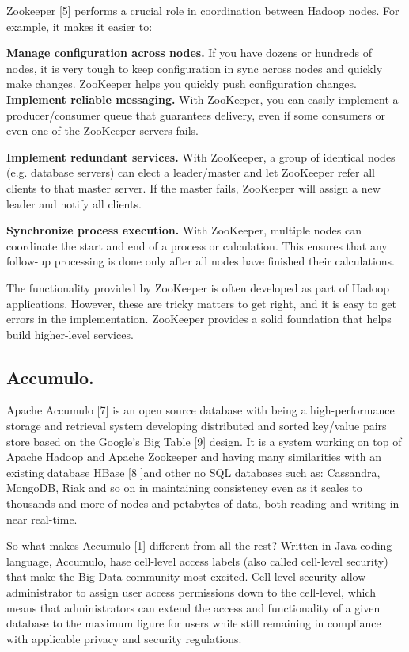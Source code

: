 \documentclass{acm_proc_article-sp}
\begin{document}
\setlength{\parindent}{1cm} Zookeeper [5] performs a crucial role in coordination between Hadoop nodes. For example, it makes it easier to:

\setlength{\parindent}{1cm} \textbf{Manage configuration across nodes.}  If you have dozens or hundreds of nodes, it is very tough to keep configuration in sync across nodes and quickly make changes. ZooKeeper helps you quickly push configuration changes.\\

\setlength{\parindent}{1cm} \textbf{Implement reliable messaging.} With ZooKeeper, you can easily implement a producer/consumer queue that guarantees delivery, even if some consumers or even one of the ZooKeeper servers fails.

\setlength{\parindent}{1cm} \textbf{Implement redundant services.} With ZooKeeper, a group of identical nodes (e.g. database servers) can elect a leader/master and let ZooKeeper refer all clients to that master server. If the master fails, ZooKeeper will assign a new leader and notify all clients.

\setlength{\parindent}{1cm} \textbf{Synchronize process execution.} With ZooKeeper, multiple nodes can coordinate the start and end of a process or calculation. This ensures that any follow-up processing is done only after all nodes have finished their calculations.

\setlength{\parindent}{1cm} The functionality provided by ZooKeeper is often developed as part of Hadoop applications. However, these are tricky matters to get right, and it is easy to get errors in the implementation. ZooKeeper provides a solid foundation that helps build higher-level services.

\subsection{Accumulo. } Apache Accumulo [7] is an open source database with being a high-performance storage and retrieval system developing distributed and sorted key/value pairs store based on the Google’s Big Table [9] design. It is a system working on top of Apache Hadoop and Apache Zookeeper and having many similarities with an existing database HBase [8 ]and other no SQL databases such as: Cassandra, MongoDB, Riak and so on in maintaining consistency even as it scales to thousands and more of nodes and petabytes of data, both reading and writing in near real-time.

\setlength{\parindent}{1cm} So what makes Accumulo [1] different from all the rest? Written in Java coding language, Accumulo, hase cell-level access labels (also called cell-level security) that make the Big Data community most excited. Cell-level security allow administrator to assign user access permissions down to the cell-level, which means that administrators can extend the access and functionality of a given database to the maximum figure for users while still remaining in compliance with applicable privacy and security regulations.
\end{document}
